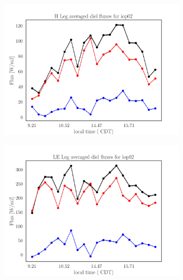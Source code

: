 \documentclass[draft]{agujournal2019}
\begin{document}
\begin{figure}[hbtp]
 \medskip
 \begin{subfigure}{0.49\textwidth}
     \includegraphics[width=\textwidth]{H_IOP02_diel.png}
     \label{fig:H_IOP02_diel}
 \end{subfigure}
 \hfill
 \begin{subfigure}{0.49\textwidth}
     \includegraphics[width=\textwidth]{LE_IOP02_diel.png}
     \label{fig:LE_IOP02_diel}
 \end{subfigure}


\end{figure}
\end{document}
